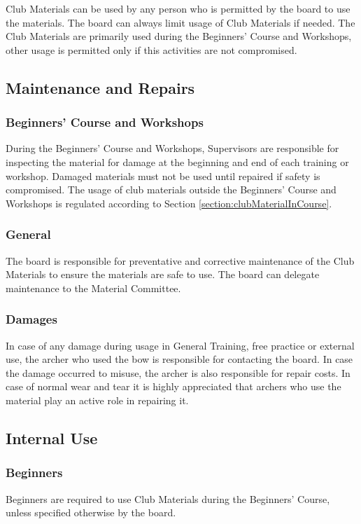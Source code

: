 \documentclass[a4paper]{article}
\begin{document}
Club Materials can be used by any person who is permitted by the board to use the materials. The board can always limit usage of Club Materials if needed. The Club Materials are primarily used during the Beginners' Course and Workshops, other usage is permitted only if this activities are not compromised.

\subsection{Maintenance and Repairs}
\subsubsection{Beginners' Course and Workshops}
During the Beginners' Course and Workshops, Supervisors are responsible for inspecting the material for damage at the beginning and end of each training or workshop. Damaged materials must not be used until repaired if safety is compromised. The usage of club materials outside the Beginners' Course and Workshops is regulated according to Section \ref{section:clubMaterialInCourse}.

\subsubsection{General}
The board is responsible for preventative and corrective maintenance of the Club Materials to ensure the materials are safe to use. The board can delegate maintenance to the Material Committee. 

\subsubsection{Damages}
In case of any damage during usage in General Training, free practice or external use, the archer who used the bow is responsible for contacting the board. In case the damage occurred to misuse, the archer is also responsible for repair costs. In case of normal wear and tear it is highly appreciated that archers who use the material play an active role in repairing it.

\subsection{Internal Use}
\subsubsection{Beginners}
Beginners are required to use Club Materials during the Beginners' Course, unless specified otherwise by the board.
\end{document}
